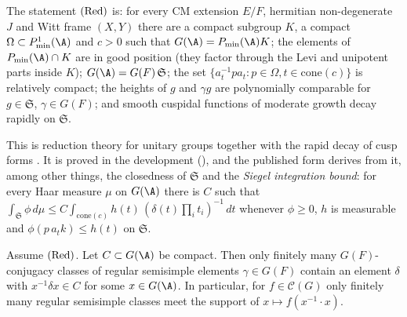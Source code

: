 \begin{definition}\label{pf:multnc:def-siegel}
The statement $\textup{(Red)}$ is: for every CM extension $E/F$, hermitian non-degenerate $J$ and Witt frame $(X,Y)$ there
are a compact subgroup $K$, a compact $\Omega\subset P^1_{\min}(\A)$ and $c>0$ such that $G(\A)=P_{\min}(\A)K$; the
elements of $P_{\min}(\A)\cap K$ are in good position (they factor through the Levi and unipotent parts inside $K$);
$G(\A)=G(F)\,\mathfrak S$; the set $\{a_t^{-1}pa_t:p\in\Omega,t\in\mathrm{cone}(c)\}$ is relatively compact; the heights of
$g$ and $\gamma g$ are polynomially comparable for $g\in\mathfrak S$, $\gamma\in G(F)$; and smooth cuspidal functions of
moderate growth decay rapidly on $\mathfrak S$.
\end{definition}

This is reduction theory for unitary groups \cite{Borel1969} together with the rapid decay of cusp forms
\cite{HarishChandra1968}. It is proved in the development (), and the
published form  derives from it, among other things, the closedness of
$\mathfrak S$ and the \emph{Siegel integration bound}: for every Haar measure $\mu$ on $G(\A)$ there is $C$ such that
$\int_{\mathfrak S}\phi\,d\mu\le C\int_{\mathrm{cone}(c)}h(t)\,(\delta(t)\prod_it_i)^{-1}\,dt$ whenever $\phi\ge0$,
$h$ is measurable and $\phi(p\,a_tk)\le h(t)$ on $\mathfrak S$.

\begin{lemma}\label{pf:multnc:regfin}
Assume $\textup{(Red)}$. Let $C\subset G(\A)$ be compact. Then only finitely many $G(F)$-conjugacy classes of regular
semisimple elements $\gamma\in G(F)$ contain an element $\delta$ with $x^{-1}\delta x\in C$ for some $x\in G(\A)$. In
particular, for $f\in\mathcal C(G)$ only finitely many regular semisimple classes meet the support of $x\mapsto
f(x^{-1}\cdot x)$.
\end{lemma}

